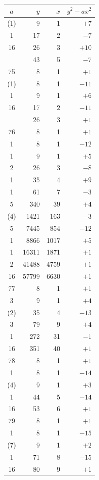 \documentclass[11pt]{article}
\begin{document}
\begin{center}
\renewcommand{\arraystretch}{1.05}
\begin{tabular}{|c|r|r|r|}
\hline
$a$ & $y$ & $x$ & $y^2 - ax^2$ \\
\hline
(1) & 9 & 1 & $+7$ \\
1 & 17 & 2 & $-7$ \\
16 & 26 & 3 & $+10$ \\
 & 43 & 5 & $-7$ \\
\hline
75 & 8 & 1 & $+1$ \\
(1) & 8 & 1 & $-11$ \\
1 & 9 & 1 & $+6$ \\
16 & 17 & 2 & $-11$ \\
 & 26 & 3 & $+1$ \\
\hline
76 & 8 & 1 & $+1$ \\
1 & 8 & 1 & $-12$ \\
1 & 9 & 1 & $+5$ \\
2 & 26 & 3 & $-8$ \\
1 & 35 & 4 & $+9$ \\
1 & 61 & 7 & $-3$ \\
5 & 340 & 39 & $+4$ \\
(4) & 1421 & 163 & $-3$ \\
5 & 7445 & 854 & $-12$ \\
1 & 8866 & 1017 & $+5$ \\
1 & 16311 & 1871 & $+1$ \\
2 & 41488 & 4759 & $+1$ \\
16 & 57799 & 6630 & $+1$ \\
\hline
77 & 8 & 1 & $+1$ \\
3 & 9 & 1 & $+4$ \\
(2) & 35 & 4 & $-13$ \\
3 & 79 & 9 & $+4$ \\
1 & 272 & 31 & $-1$ \\
16 & 351 & 40 & $+1$ \\
\hline
78 & 8 & 1 & $+1$ \\
1 & 8 & 1 & $-14$ \\
(4) & 9 & 1 & $+3$ \\
1 & 44 & 5 & $-14$ \\
16 & 53 & 6 & $+1$ \\
\hline
79 & 8 & 1 & $+1$ \\
1 & 8 & 1 & $-15$ \\
(7) & 9 & 1 & $+2$ \\
1 & 71 & 8 & $-15$ \\
16 & 80 & 9 & $+1$ \\

\end{tabular}
\end{center}
\end{document}
